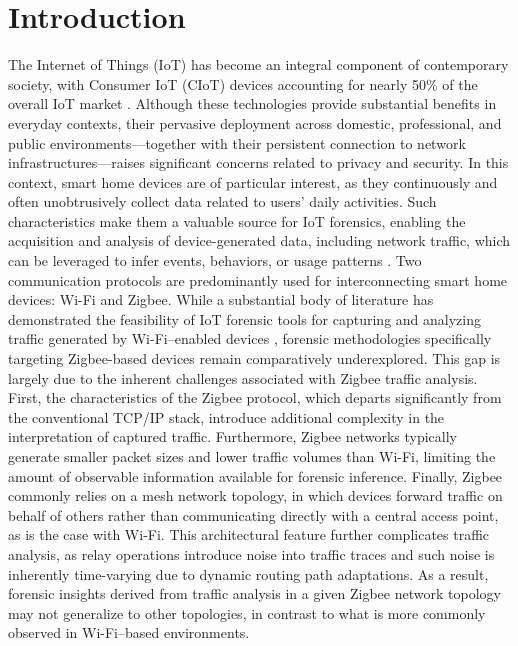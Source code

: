 \section{Introduction}

The Internet of Things (IoT) has become an integral component of contemporary society, with Consumer IoT (CIoT) devices accounting for nearly 50\% of the overall IoT market \cite{cisco2020cisco}. Although these technologies provide substantial benefits in everyday contexts, their pervasive deployment across domestic, professional, and public environments—together with their persistent connection to network infrastructures—raises significant concerns related to privacy and security. In this context, smart home devices are of particular interest, as they continuously and often unobtrusively collect data related to users’ daily activities. Such characteristics make them a valuable source for IoT forensics, enabling the acquisition and analysis of device-generated data, including network traffic, which can be leveraged to infer events, behaviors, or usage patterns \cite{stoyanova}. Two communication protocols are predominantly used for interconnecting smart home devices: Wi-Fi and Zigbee. While a substantial body of literature has demonstrated the feasibility of IoT forensic tools for capturing and analyzing traffic generated by Wi-Fi–enabled devices \cite{fabio,fabio2,fabio3}, forensic methodologies specifically targeting Zigbee-based devices remain comparatively underexplored. This gap is largely due to the inherent challenges associated with Zigbee traffic analysis. First, the characteristics of the Zigbee protocol, which departs significantly from the conventional TCP/IP stack, introduce additional complexity in the interpretation of captured traffic. Furthermore, Zigbee networks typically generate smaller packet sizes and lower traffic volumes than Wi-Fi, limiting the amount of observable information available for forensic inference. Finally, Zigbee commonly relies on a mesh network topology, in which devices forward traffic on behalf of others rather than communicating directly with a central access point, as is the case with Wi-Fi. This architectural feature further complicates traffic analysis, as relay operations introduce noise into traffic traces and such noise is inherently time-varying due to dynamic routing path adaptations. As a result, forensic insights derived from traffic analysis in a given Zigbee network topology may not generalize to other topologies, in contrast to what is more commonly observed in Wi-Fi–based environments.

